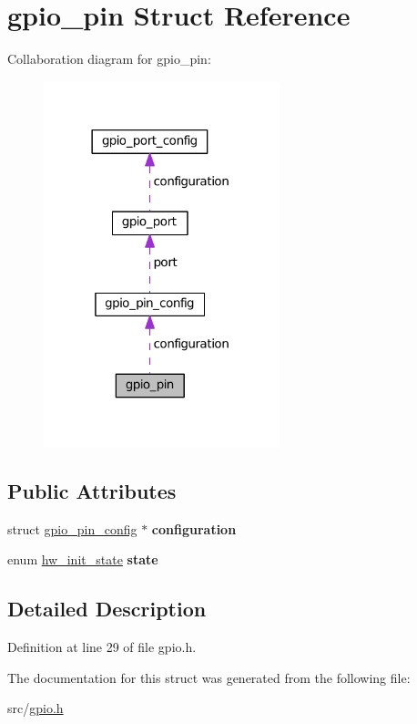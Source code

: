 \hypertarget{structgpio__pin}{}\section{gpio\+\_\+pin Struct Reference}
\label{structgpio__pin}


Collaboration diagram for gpio\+\_\+pin\+:\nopagebreak
\begin{figure}[H]
\begin{center}
\leavevmode
\includegraphics[width=194pt]{structgpio__pin__coll__graph}
\end{center}
\end{figure}
\subsection*{Public Attributes}
\begin{DoxyCompactItemize}
\item 
\hypertarget{structgpio__pin_acb6a2426999aa0f3e40d37a02f791e75}{}struct \hyperlink{structgpio__pin__config}{gpio\+\_\+pin\+\_\+config} $\ast$ {\bfseries configuration}\label{structgpio__pin_acb6a2426999aa0f3e40d37a02f791e75}

\item 
\hypertarget{structgpio__pin_a4d4c7f491d051331985524f88f81fa58}{}enum \hyperlink{hw_8h_a3c02952100e7d051b77cdf060ca0ba9b}{hw\+\_\+init\+\_\+state} {\bfseries state}\label{structgpio__pin_a4d4c7f491d051331985524f88f81fa58}

\end{DoxyCompactItemize}


\subsection{Detailed Description}


Definition at line 29 of file gpio.\+h.



The documentation for this struct was generated from the following file\+:\begin{DoxyCompactItemize}
\item 
src/\hyperlink{gpio_8h}{gpio.\+h}\end{DoxyCompactItemize}
